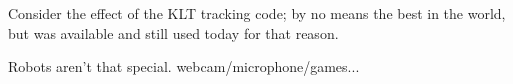 



%
Consider the effect of the KLT tracking code; by no means
the best in the world, but was available and still used
today for that reason.



Robots aren't that special.  webcam/microphone/games...

